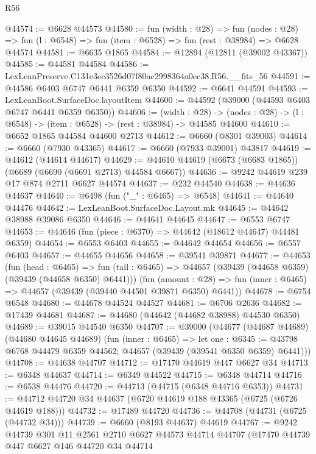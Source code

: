 \begin{lexlean}{R56}
\begin{coremodule}
@44574 := @6628 @44573
@44580 := fun (width : @28) =>
  fun (nodes : @28) => fun (l : @6548) => fun (item : @6528) => fun (rest : @38984) => @6628 @44574
@44581 := @6635 @1865
@44584 := @12894 (@12811 (@39002 @43367))
@44585 := @44581 @44584
@44586 := LexLeanPreserve.C131e3ec3526d07f80ac2998364a0ec38.R56.__fits_56
@44591 := @44586 @6403 @6747 @6441 @6359 @6350
@44592 := @6641 @44591
@44593 := LexLeanBoot.SurfaceDoc.layoutItem
@44600 := @44592 (@39000 (@44593 @6403 @6747 @6441 @6359 @6350))
@44606 := (width : @28) ->
  (nodes : @28) -> (l : @6548) -> (item : @6528) -> (rest : @38984) -> @44585 @44600
@44610 := @6652 @1865 @44584 @44600 @2713
@44612 := @6660 (@8301 @39003)
@44614 := @6660 (@7930 @43365)
@44617 := @6660 (@7933 @39001) @43817
@44619 := @44612 (@44614 @44617)
@44629 := @44610 @44619 (@6673 (@6683 @1865)) (@6689 (@6690 (@6691 @2713) @44584 @6667))
@44636 := @9242 @44619 @239 @17 @874 @2711 @6627 @44574
@44637 := @232 @44540
@44638 := @44636 @44637
@44640 := @6498 (fun ("_" : @6465) => @6548)
@44641 := @44640 @44476
@44642 := LexLeanBoot.SurfaceDoc.Layout.mk
@44645 := @44642 @38988 @39086 @6350
@44646 := @44641 @44645
@44647 := @6553 @6747
@44653 := @44646 (fun (piece : @6370) => @44642 (@18612 @44647) @44481 @6359)
@44654 := @6553 @6403
@44655 := @44642 @44654
@44656 := @6557 @6403
@44657 := @44655 @44656
@44658 := @39541 @39871
@44677 := @44653
    (fun (head : @6465) =>
    fun (tail : @6465) => @44657 (@39439 (@44658 @6359) (@39439 (@44658 @6350) @6441)))
    (fun (amount : @28) =>
    fun (inner : @6465) => @44657 (@39439 (@39440 @44501 @39871 @6350) @6441))
@44678 := @6754 @6548
@44680 := @44678 @44524 @44527
@44681 := @6706 @2636
@44682 := @17439 @44681
@44687 := @44680 (@44642 (@44682 @38988) @44530 @6350)
@44689 := @39015 @44540 @6350
@44707 := @39000
    (@44677
      (@44687 @44689)
      (@44680 @44645 @44689)
      (fun (inner : @6465) =>
      let one : @6345 := @43798 @6768 @44479 @6359 @44562;
      @44657 (@39439 (@39541 @6350 @6359) @6441)))
@44708 := @44638 @44707
@44712 := @17470 @44619 @447 @6627 @34
@44713 := @6348 @44637
@44714 := @6349 @44522
@44715 := @6348 @44714
@44716 := @6538 @44476
@44720 := @44713 (@44715 (@6348 @44716 @6353))
@44731 := @44712 @44720 @34 @44637 (@6720 @44619 @188 @43365 (@6725 (@6726 @44619 @188)))
@44732 := @17489 @44720
@44736 := @44708 (@44731 (@6725 (@44732 @34)))
@44739 := @6660 (@8193 @44637) @44619
@44767 := @9242
    @44739
    @301
    @11
    @2561
    @2710
    @6627
    @44573
    @44714
    @44707
    (@17470
      @44739
      @447
      @6627
      @146
      @44720
      @34
      @44714

\end{coremodule}
\end{lexlean}
